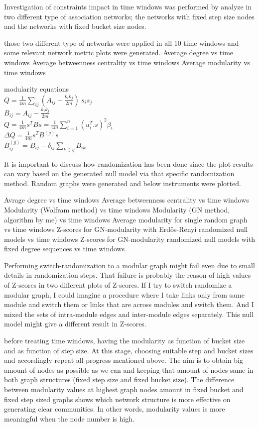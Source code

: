 Investigation of constraints impact in time windows was performed by analyze in two different type of association networks; the networks with fixed step size nodes and the networks with fixed bucket size nodes.

those two different type of networks were applied in all 10 time windows and some relevant network metric plots were generated. 
Average degree vs time windows
Average betweenness centrality vs time windows
Average modularity vs time windows

modularity equations\\
$Q = \frac {1} {4 m}\sum_ {ij} (A_{ij} - \frac {k_{i} k_{j}}{2 m}) \
s_{i} s_{j}$\\
$B_{ij} = A_{ij} - \frac {k_ {i} k_ {j}} {2 m}$\\
$Q = \frac {1} {4 m} s^{T} Bs = \frac {1} {4 m}\sum_ {i = 
	1}^{n} (u_ {i}^{T} . s)^{2}\beta_ {i}$\\
$\Delta Q = \frac {1} {4 m} s^{T} B^{(g)} s$\\
$B_{ij}^{(g)} = B_{ij} - \delta_{ij}\sum_ {k\in g} B_{ik}$

It is important to discuss how randomization has been done since the plot results can vary based on the generated null model via that specific randomization method. 
Random graphs were generated and below instruments were plotted.

Avrage degree vs time windows
Average betweenness centrality vs time windows
Modularity (Wolfram method) vs time windows
Modularity (GN method, algorithm by me) vs time windows
Average modularity for single random graph vs time windows
Z-scores for GN-modularity with Erdös-Renyi randomized null models vs time windows
Z-scores for GN-modularity randomized null models with fixed degree sequences vs time windows

Performing switch-randomization to a modular graph might fail even due to small details in randomization steps. That failure is probably the reason of high values of Z-scores in two different plots of Z-scores. If I try to switch randomize a modular graph, I could imagine a procedure where I take links only from same module and switch them or links that are across modules and switch them. And I mixed the sets of intra-module edges and inter-module edges separately. This null model might give a different result in Z-scores.

before treating time windows, having the modularity as function of bucket size and as function of step size. At this stage, choosing suitable step and bucket sizes and accordingly repeat all progress mentioned above. The aim is to obtain big amount of nodes as possible as we can and keeping that amount of nodes same in both graph structures (fixed step size and fixed bucket size). The difference between modularity values at highest graph nodes amount in fixed bucket and fixed step sized graphs shows which network structure is more effective on generating clear communities. In other words, modularity values is more meaningful when the node number is high.

